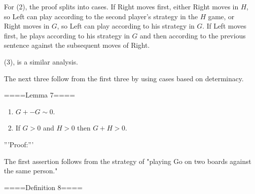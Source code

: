 For (2), the proof splits into cases. If Right moves first, either Right moves in $H$, so Left can play according to the second player's strategy in the $H$ game, or Right moves in $G$, so Left can play according to his strategy in $G$. If Left moves first, he plays according to his strategy in $G$ and then according to the previous sentence against the subsequent moves of Right.

(3), is a similar analysis.

The next three follow from the first three by using cases based on determinacy.

====Lemma 7====
\begin{enumerate}
  \item  $G+ -G\sim 0$.
  \item  If $G>0$ and $H>0$ then $G+H>0$.
\end{enumerate}

'''Proof:'''

The first assertion follows from the strategy of "playing Go on two boards against the same person."


====Definition 8====
